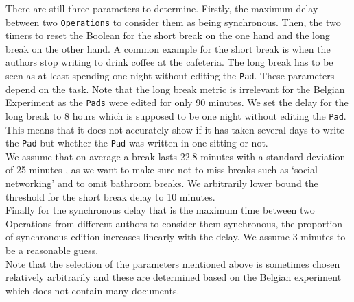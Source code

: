 \documentclass[a4, twocolumn, 12pt]{article}
\begin{document}
There are still three parameters to determine. Firstly, the maximum delay between two \texttt{Operations} to consider them as being synchronous. Then, the two timers to reset the Boolean for the short break on the one hand and the long break on the other hand. A common example for the short break is when the authors stop writing to drink coffee at the cafeteria. The long break has to be seen as at least spending one night without editing the \texttt{Pad}. These parameters depend on the task. Note that the long break metric is irrelevant for the Belgian Experiment as the \texttt{Pads} were edited for only 90 minutes. We set the delay for the long break to  8 hours which is supposed to be one night without editing the \texttt{Pad}. This means that it does not accurately show if it has taken several days to write the \texttt{Pad} but whether the \texttt{Pad} was written in one sitting or not. \\
We assume that on average a break lasts 22.8 minutes with a standard deviation of 25 minutes \cite{Daniel}, as we want to make sure not to miss breaks such as ‘social networking’ and to omit bathroom breaks. We arbitrarily lower bound the threshold for the short break delay to 10 minutes. \\
Finally for the synchronous delay that is the maximum time between two Operations from different authors to consider them synchronous, the proportion of synchronous edition increases linearly with the delay. We assume 3 minutes to be a reasonable guess.\\
Note that the selection of the parameters mentioned above is sometimes chosen relatively arbitrarily and these are determined based on the Belgian experiment which does not contain many documents. 
\end{document}
